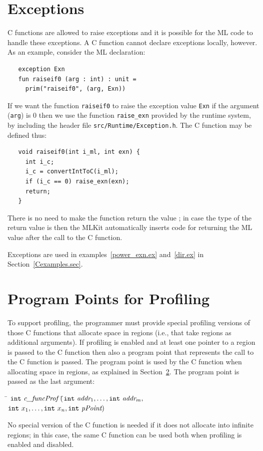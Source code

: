 \documentclass[12pt]{book}
\begin{document}
\section{Exceptions}
\label{C_exceptions.sec}
C functions are allowed to raise exceptions and it is possible for the
ML code to handle these exceptions. A C function cannot declare
exceptions locally, however. As an example, consider the ML
declaration:
\begin{verbatim}
   exception Exn
   fun raiseif0 (arg : int) : unit = 
     prim("raiseif0", (arg, Exn))
\end{verbatim}
If we want the function \texttt{raiseif0} to raise the exception value
\texttt{Exn} if the argument (\texttt{arg}) is 0 then we use the
function \verb|raise_exn| provided by the runtime system, by
including the header file {\tt src/Runtime/Exception.h}. The C
function  may be defined thus:
\begin{verbatim}
   void raiseif0(int i_ml, int exn) {
     int i_c;
     i_c = convertIntToC(i_ml);
     if (i_c == 0) raise_exn(exn);
     return;
   }
\end{verbatim}
There is no need to make the function return the value ;
in case the type of the return value is  then the MLKit
automatically inserts code for returning the ML value \boxml{()} after
the call to the C function.

Exceptions are used in examples~\ref{power_exn.ex} and~\ref{dir.ex} in
Section~\ref{Cexamples.sec}.

\section{Program Points for Profiling}
\label{prof.sec}
To support profiling, the programmer must provide special profiling
versions of those C functions that allocate space in regions (i.e.,
that take regions as additional arguments). If profiling is enabled
and at least one pointer to a region is passed to the C function then
also a program point that represents the call to the C function is
passed.  The program point is used by the C function when allocating
space in regions, as explained in Section~\ref{prof.sec}. The program
point is passed as the last argument:
\begin{tabbing}
\indent\=  $\texttt{int} \ \emph{c\_funcProf} \ ($\=$\texttt{int}\ \emph{addr}_1,
    \ldots, \texttt{int}\ \emph{addr}_m,$\\
  \>\>$ \texttt{int}\ x_1, \ldots,
    \texttt{int}\ x_n, \texttt{int}\ \emph{pPoint}) $
\end{tabbing}
\noindent
No special version of the C function is needed if it does not allocate
into infinite regions; in this case, the same C function can be used
both when profiling is enabled and disabled.
\end{document}
